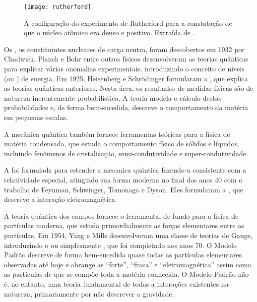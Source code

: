 \begin{figure}
\begin{center}
\texttt{[image: rutherford]}
\end{center}
\caption[O  de Rutherford.]{A configuração do experimento de
Rutherford para a constatação de que o núcleo atômico era denso e
positivo. Extraída de \cite{partadv}.}
\label{fig:rutherford}
\end{figure}

Os , os constituintes nucleares de carga neutra, foram
descobertos em 1932 por Chadwick. Planck e Bohr entre outros físicos
desenvolveram as teorias quânticas para explicar várias anomalias
experimentais, introduzindo o conceito de níveis (ou ) de
energia. Em 1925, Heisenberg e Schrödinger formularam a , que explica as teorias quânticas anteriores. Nesta área, os
resultados de medidas físicas são de natureza inerentemente probabilística. A
teoria modela o cálculo destas probabilidades e, de forma bem-sucedida,
descreve o comportamento da matéria em pequenas escalas.

A mecânica quântica tam\-bém fornece ferramentas te\-ó\-ri\-cas para a
fí\-si\-ca de ma\-té\-ria condensada, que estuda o comportamento físico de
sólidos e líquidos, incluindo fenômenos de cristalização, semi-condutividade e
super-condutividade.

A  foi formulada para estender a mecanica
quântica fazendo-a consistente com a relatividade especial, atingindo sua
forma moderna no final dos anos 40 com o trabalho de Feynman, Schwinger,
Tomonaga e Dyson. Eles formularam a , que
descreve a interação eletromagnética.

A teoria quântica dos campos fornece o ferramental de fundo para a fí\-si\-ca
de par\-tí\-cu\-las moderna, que estuda primordialmente as forças elementares
entre as partículas. Em 1954, Yang e Mills desenvolveram uma classe de teorias
de Gauge, introduzindo o  ou simplesmente
, que foi completado nos anos 70. O Modelo Padrão descreve
de forma bem-sucedida quase todas as partículas elementares observadas até
hoje e abrange as  ``forte'', ``fraca'' e
``eletromagnética'' assim como as partículas de que se compõe toda a matéria
conhecida. O Modelo Padrão não é, no entanto, uma teoria fundamental de todas
a interações existentes na natureza, primariamente por não descrever a
gravidade.

